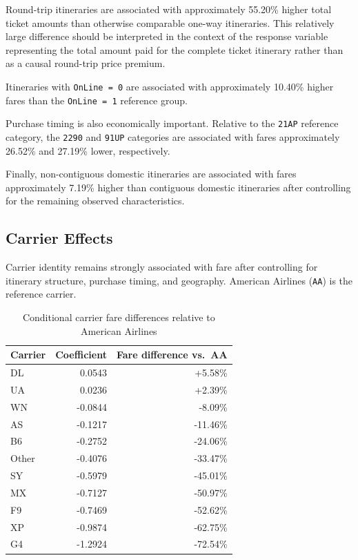 \documentclass[11pt,a4paper]{article}
\begin{document}
Round-trip itineraries are associated with approximately 55.20\% higher total ticket amounts than otherwise comparable one-way itineraries. This relatively large difference should be interpreted in the context of the response variable representing the total amount paid for the complete ticket itinerary rather than as a causal round-trip price premium.

Itineraries with \texttt{OnLine = 0} are associated with approximately 10.40\% higher fares than the \texttt{OnLine = 1} reference group.

Purchase timing is also economically important. Relative to the \texttt{21AP} reference category, the \texttt{2290} and \texttt{91UP} categories are associated with fares approximately 26.52\% and 27.19\% lower, respectively.

Finally, non-contiguous domestic itineraries are associated with fares approximately 7.19\% higher than contiguous domestic itineraries after controlling for the remaining observed characteristics.

\subsection{Carrier Effects}

Carrier identity remains strongly associated with fare after controlling for itinerary structure, purchase timing, and geography. American Airlines (\texttt{AA}) is the reference carrier.

\begin{table}[H]
\centering
\caption{Conditional carrier fare differences relative to American Airlines}
\label{tab:carrier-effects}
\begin{tabular}{lrr}
\toprule
\textbf{Carrier} & \textbf{Coefficient} & \textbf{Fare difference vs.\ AA} \\
\midrule
DL & 0.0543 & +5.58\% \\
UA & 0.0236 & +2.39\% \\
WN & -0.0844 & -8.09\% \\
AS & -0.1217 & -11.46\% \\
B6 & -0.2752 & -24.06\% \\
Other & -0.4076 & -33.47\% \\
SY & -0.5979 & -45.01\% \\
MX & -0.7127 & -50.97\% \\
F9 & -0.7469 & -52.62\% \\
XP & -0.9874 & -62.75\% \\
G4 & -1.2924 & -72.54\% \\
\bottomrule
\end{tabular}
\end{table}
\end{document}
